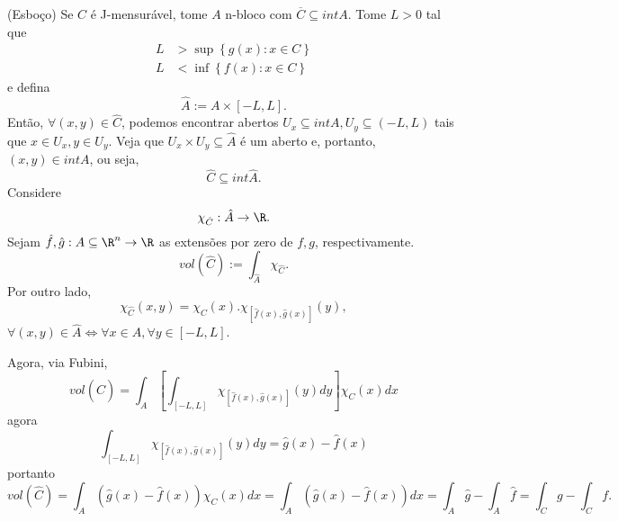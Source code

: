 \begin{demo}
    (Esboço) Se $C$ é J-mensurável, tome $A$ n-bloco com $\overline{C} \subseteq int A$. Tome $L>0$ tal que
    \begin{align*}
	L &> \sup\left\{ g\left( x \right) : x\in C \right\} \\
	L &< \inf \left\{ f\left( x \right) : x\in C \right\} 
    \end{align*}
    e defina \[
    \hat{A} := A\times \left[ -L, L \right] 
    .\] Então, $\forall \left( x,y \right) \in \hat{C}$, podemos encontrar abertos $U_x \subseteq int A, U_y \subseteq \left( -L, L \right) $ tais que $x\in U_x, y\in U_y$. Veja que $U_x \times U_y \subseteq \hat{A}$ é um aberto e, portanto, $\left( x,y \right) \in int A$, ou seja, \[
    \hat{C} \subseteq int \hat{A} 
    .\] Considere \[
    \chi_{\hat{C}}: \hat{A}\to \R
    .\] Sejam $\hat{f}, \hat{g}: A\subseteq\R^{n} \to  \R$ as extensões por zero de $f, g$, respectivamente. \[
    vol \left( \hat{C} \right) := \int_{\hat{A}} \chi_{\hat{C}}
    .\] Por outro lado, \[
    \chi_{\hat{C}}\left( x,y \right) = \chi_C\left( x \right) . \chi_{\left[ \hat{f}(x), \hat{g}\left( x \right)  \right] }\left( y \right) 
    ,\] $\forall \left( x,y \right) \in  \hat{A} \iff \forall x\in A, \forall y\in \left[ -L,L \right] $.

    Agora, via Fubini, \[
	vol\left( \hat{C} \right) = \int_A \left[ \int_{\left[ -L,L \right] }\chi_{\left[ \hat{f}\left( x \right) , \hat{g}\left( x \right)  \right]} \left( y \right) dy  \right]\chi_{C}\left( x  \right) dx 
    \] agora \[
    \int_{\left[ -L,L \right] }\chi_{\left[ \hat{f}\left( x \right) , \hat{g}\left( x \right)  \right]} \left( y \right) dy = \hat{g}\left( x \right) - \hat{f}\left( x \right) 
    \]  portanto \[
    vol\left( \hat{C} \right) = \int_A \left( \hat{g}(x) - \hat{f}(x) \right) \chi_C \left( x \right) dx = \int_A \left( \hat{g}(x) -\hat{f}(x) \right) dx = \int_A \hat{g} - \int_A \hat{f} = \int_C g - \int_C f
    .\] 
\end{demo}

